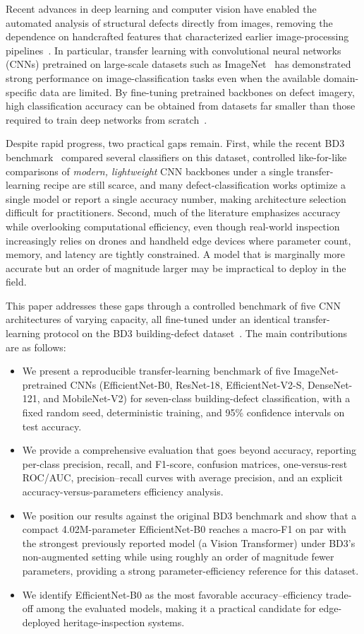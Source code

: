 \documentclass[conference]{IEEEtran}
\begin{document}
Recent advances in deep learning and computer vision have enabled the automated analysis of structural defects directly from images, removing the dependence on handcrafted features that characterized earlier image-processing pipelines~\cite{ref5}. In particular, transfer learning with convolutional neural networks (CNNs) pretrained on large-scale datasets such as ImageNet~\cite{ref23} has demonstrated strong performance on image-classification tasks even when the available domain-specific data are limited. By fine-tuning pretrained backbones on defect imagery, high classification accuracy can be obtained from datasets far smaller than those required to train deep networks from scratch~\cite{ref22}.

Despite rapid progress, two practical gaps remain. First, while the recent BD3 benchmark~\cite{ref40} compared several classifiers on this dataset, controlled like-for-like comparisons of \emph{modern, lightweight} CNN backbones under a single transfer-learning recipe are still scarce, and many defect-classification works optimize a single model or report a single accuracy number, making architecture selection difficult for practitioners. Second, much of the literature emphasizes accuracy while overlooking computational efficiency, even though real-world inspection increasingly relies on drones and handheld edge devices where parameter count, memory, and latency are tightly constrained. A model that is marginally more accurate but an order of magnitude larger may be impractical to deploy in the field.

This paper addresses these gaps through a controlled benchmark of five CNN architectures of varying capacity, all fine-tuned under an identical transfer-learning protocol on the BD3 building-defect dataset~\cite{ref40}. The main contributions are as follows:
\begin{itemize}
\item We present a reproducible transfer-learning benchmark of five ImageNet-pretrained CNNs (EfficientNet-B0, ResNet-18, EfficientNet-V2-S, DenseNet-121, and MobileNet-V2) for seven-class building-defect classification, with a fixed random seed, deterministic training, and 95\% confidence intervals on test accuracy.
\item We provide a comprehensive evaluation that goes beyond accuracy, reporting per-class precision, recall, and F1-score, confusion matrices, one-versus-rest ROC/AUC, precision--recall curves with average precision, and an explicit accuracy-versus-parameters efficiency analysis.
\item We position our results against the original BD3 benchmark and show that a compact 4.02M-parameter EfficientNet-B0 reaches a macro-F1 on par with the strongest previously reported model (a Vision Transformer) under BD3's non-augmented setting while using roughly an order of magnitude fewer parameters, providing a strong parameter-efficiency reference for this dataset.
\item We identify EfficientNet-B0 as the most favorable accuracy--efficiency trade-off among the evaluated models, making it a practical candidate for edge-deployed heritage-inspection systems.
\end{itemize}
\end{document}
